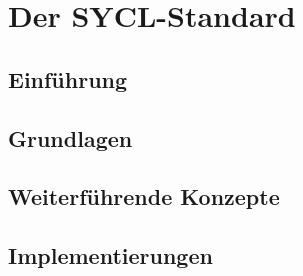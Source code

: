 \chapter{Der SYCL-Standard}\label{sycl}

\section{Einführung}\label{sycl:intro}

\section{Grundlagen}\label{sycl:grundlagen}

\section{Weiterführende Konzepte}\label{sycl:konzepte}

\section{Implementierungen}\label{sycl:implementierungen}
